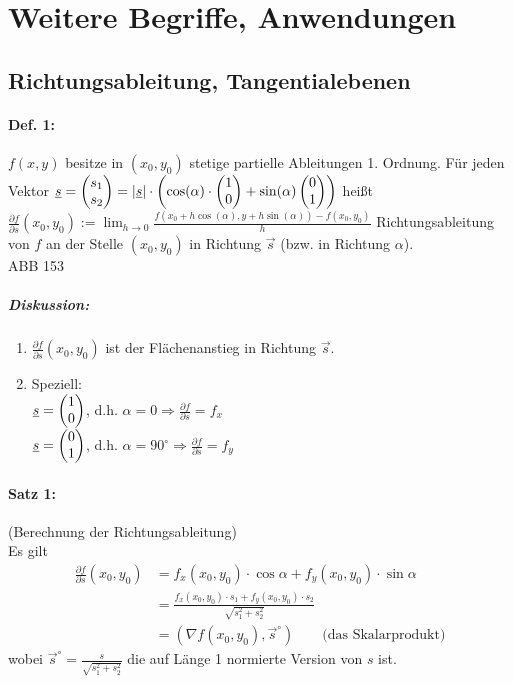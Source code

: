 \section{Weitere Begriffe, Anwendungen}
\subsection{Richtungsableitung, Tangentialebenen}
\paragraph{Def. 1:} $f(x,y)$ besitze in $(x_0,y_0)$ stetige partielle Ableitungen 1. Ordnung. Für jeden Vektor $\underline{s}=\begin{pmatrix}s_1\\s_2\end{pmatrix}=|\underline{s}| \cdot \left(\cos (\alpha)\cdot \begin{pmatrix}1\\0\end{pmatrix}+ \sin (\alpha) \begin{pmatrix}0 \\ 1\end{pmatrix}\right)$ heißt \\
$\frac{\partial f}{\partial s}(x_0,y_0):= \lim_{h\to 0} \frac{f(x_0+h \cos (\alpha) , y+h\sin (\alpha))-f(x_0,y_0)}{h}$ Richtungsableitung von $f$ an der Stelle $(x_0,y_0)$ in Richtung $\vec{s}$ (bzw. in Richtung $\alpha$).\\
ABB 153

\subparagraph{Diskussion:} 
\begin{enumerate}
\item $\frac{\partial f}{\partial s}(x_0,y_0)$ ist der Flächenanstieg in Richtung $\vec{s}$.
\item Speziell: \\
$\underline{s}=\begin{pmatrix}1\\0\end{pmatrix}$, d.h. $\alpha=0 \Rightarrow \frac{\partial f}{\partial s}=f_x$\\
$\underline{s}=\begin{pmatrix}0\\1\end{pmatrix}$, d.h. $\alpha=90^\circ \Rightarrow \frac{\partial f}{\partial s}=f_y$
\end{enumerate}

\paragraph{Satz 1:} (Berechnung der Richtungsableitung)\\
Es gilt 
\begin{align*}
\frac{\partial f}{\partial s} (x_0,y_0) &= f_x(x_0,y_0) \cdot \cos \alpha + f_y (x_0,y_0) \cdot \sin \alpha \\
&= \frac{f_x(x_0,y_0) \cdot s_1+f_y (x_0,y_0) \cdot s_2}{\sqrt{s_1^2+s_2^2}}\\
&= \left( \nabla f(x_0,y_0) , \vec{s}^\circ \right)	\qquad \text{(das Skalarprodukt)}
\end{align*}
wobei $\vec{s}^\circ = \frac{s}{\sqrt{s_1^2+s_2^2}}$ die auf Länge 1 normierte Version von $s$ ist.

